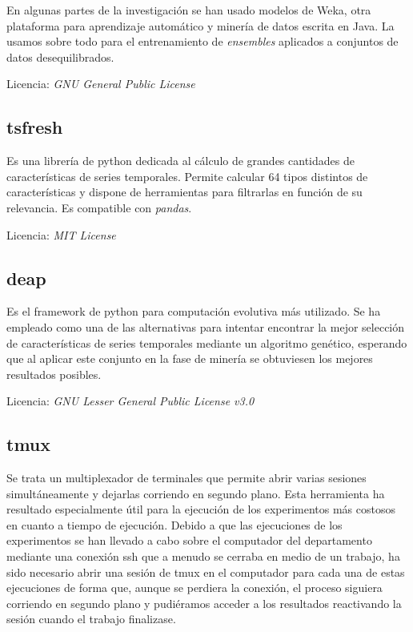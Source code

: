 En algunas partes de la investigación se han usado modelos de Weka, otra plataforma para aprendizaje automático y minería de datos escrita en Java. La usamos sobre todo para el entrenamiento de \textit{ensembles} aplicados a conjuntos de datos desequilibrados.

Licencia: \textit{GNU General Public License}

\subsection{tsfresh}

Es una librería de python dedicada al cálculo de grandes cantidades de características de series temporales. Permite calcular 64 tipos distintos de características y dispone de herramientas para filtrarlas en función de su relevancia. Es compatible con \textit{pandas}. 

Licencia: \textit{MIT License }

\subsection{deap}

Es el framework de python para computación evolutiva más utilizado. Se ha empleado como una de las alternativas para intentar encontrar la mejor selección de características de series temporales mediante un algoritmo genético, esperando que al aplicar este conjunto en la fase de minería se obtuviesen los mejores resultados posibles.  

Licencia: \textit{GNU Lesser General Public License v3.0}

\subsection{tmux}

Se trata un multiplexador de terminales que permite abrir varias sesiones simultáneamente y dejarlas corriendo en segundo plano. Esta herramienta ha resultado especialmente útil para la ejecución de los experimentos más costosos en cuanto a tiempo de ejecución. Debido a que las ejecuciones de los experimentos se han llevado a cabo sobre el computador del departamento mediante una conexión ssh que a menudo se cerraba en medio de un trabajo, ha sido necesario abrir una sesión de tmux en el computador para cada una de estas ejecuciones de forma que, aunque se perdiera la conexión, el proceso siguiera corriendo en segundo plano y pudiéramos acceder a los resultados reactivando la sesión cuando el trabajo finalizase.

